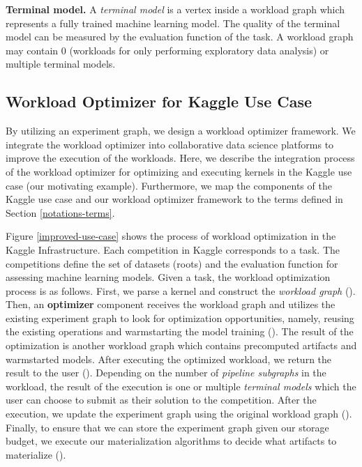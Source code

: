 \textbf{Terminal model.} A \textit{terminal model} is a vertex inside a workload graph which represents a fully trained machine learning model.
The quality of the terminal model can be measured by the evaluation function of the task.
A workload graph may contain $0$ (workloads for only performing exploratory data analysis) or multiple terminal models.


\subsection{Workload Optimizer for Kaggle Use Case}
By utilizing an experiment graph, we design a workload optimizer framework.
We integrate the workload optimizer into collaborative data science platforms to improve the execution of the workloads.
Here, we describe the integration process of the workload optimizer for optimizing and executing kernels in the Kaggle use case (our motivating example).
Furthermore, we map the components of the Kaggle use case and our workload optimizer framework to the terms defined in Section \ref{notations-terms}.

Figure \ref{improved-use-case} shows the process of workload optimization in the Kaggle Infrastructure.
Each competition in Kaggle corresponds to a task.
The competitions define the set of datasets (roots) and the evaluation function for assessing machine learning models. 
Given a task, the workload optimization process is as follows.
First, we parse a kernel and construct the \textit{workload graph} ().
Then, an \textbf{optimizer} component receives the workload graph and utilizes the existing experiment graph to look for optimization opportunities, namely, reusing the existing operations and warmstarting the model training ().
The result of the optimization is another workload graph which contains precomputed artifacts and warmstarted models.
After executing the optimized workload, we return the result to the user ().
Depending on the number of \textit{pipeline subgraphs} in the workload, the result of the execution is one or multiple \textit{terminal models} which the user can choose to submit as their solution to the competition.
After the execution, we update the experiment graph using the original workload graph ().
Finally, to ensure that we can store the experiment graph given our storage budget, we execute our materialization algorithms to decide what artifacts to materialize ().

